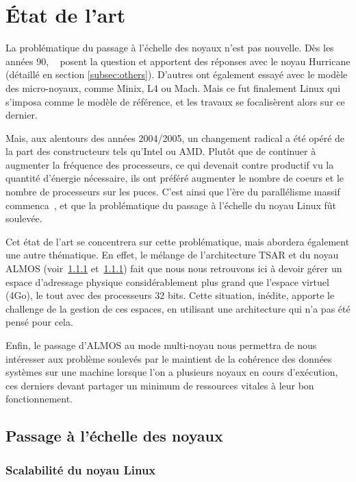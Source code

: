 \section{État de l’art}

  La problématique du passage à l’échelle des noyaux n’est pas nouvelle. Dès les
  années 90, ~\citeauthor{unrau1995hierarchical} posent la question et apportent
  des réponses avec le noyau Hurricane (détaillé en section
  \ref{subsec:others}). D’autres ont également essayé avec le modèle des
  micro-noyaux, comme Minix, L4 ou Mach. Mais ce fut finalement Linux qui
  s’imposa comme le modèle de référence, et les travaux se focalisèrent alors
  sur ce dernier.

  Mais, aux alentours des années 2004/2005, un changement radical a été opéré de
  la part des constructeurs tels qu’Intel ou AMD. Plutôt que de continuer à
  augmenter la fréquence des processeurs, ce qui devenait contre productif vu la
  quantité d’énergie nécessaire, ils ont préféré augmenter le nombre de coeurs
  et le nombre de processeurs sur les puces. C’est ainsi que l’ère du
  parallélisme massif commenca~\citep{patterson2011parallel}, et que la
  problématique du passage à l’échelle du noyau Linux fût soulevée.

  Cet état de l'art se concentrera sur cette problématique, mais abordera
  également une autre thématique. En effet, le mélange de l'architecture TSAR et
  du noyau ALMOS (voir~\ref{} et~\ref{}) fait que nous nous retrouvons ici à
  devoir gérer un espace d'adressage physique considérablement plus grand que
  l'espace virtuel (4Go), le tout avec des processeurs 32 bits. Cette situation,
  inédite, apporte le challenge de la gestion de ces espaces, en utilisant une
  architecture qui n'a pas été pensé pour cela.
  
  Enfin, le passage d’ALMOS au mode multi-noyau nous permettra de nous
  intéresser aux problème soulevés par le maintient de la cohérence des données
  systèmes sur une machine lorsque l'on a plusieurs noyaux en cours d'exécution,
  ces derniers devant partager un minimum de ressources vitales à leur bon
  fonctionnement.

  \subsection{Passage à l’échelle des noyaux}
  \label{sec:scalability}

    \subsubsection{Scalabilité du noyau Linux}

